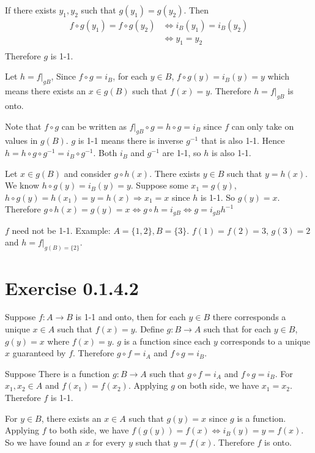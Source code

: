\documentclass[12pt]{article}
\begin{document}
 If there exists $y_1, y_2$ such that $g(y_1) = g(y_2)$. Then 
$$ \begin{aligned}
	f\circ g(y_1) = f \circ g(y_2) & \Leftrightarrow i_B(y_1) = i_B(y_2)  \\
	 &\Leftrightarrow	y_1 = y_2  \\
\end{aligned}
$$
Therefore $g$ is 1-1.  \QED

Let $h = f|_{gB}$, Since $f \circ g = i_B$, for each $y \in B$, $f \circ g (y) = i_B(y) = y$ which means there exists an $x \in g(B)$ such that $f(x) = y$. Therefore $h = f|_{gB}$ is onto. 

Note that $f \circ g$ can be written as $f|_{gB} \circ g = h \circ g = i_B$ since $f$ can only take on values in $g(B)$. $g$ is 1-1 means there is inverse $g^{-1}$ that is also 1-1. Hence $h = h \circ g \circ g^{-1} = i_B \circ g^{-1}$. Both $i_B$ and  $g^{-1}$ are 1-1, so $h$ is also 1-1.  \QED

Let $x \in g(B)$ and consider $g \circ h (x)$. There exists $y \in B$ such that $y = h(x)$. We know $h \circ g (y) = i_B(y) = y$. Suppose some $x_1 = g(y)$,  $h \circ g(y) = h(x_1) = y = h(x) \Rightarrow x_1 = x$ since $h$ is 1-1. So $g(y) = x$.  Therefore $g \circ h (x) = g (y) = x \Leftrightarrow g \circ h = i_{gB} \Leftrightarrow g = i_{gB} h^{-1}$  \QED

$f$ need not be 1-1. Example: $A = \{1, 2\}, B=\{3\}$. $f(1) = f(2) = 3$, $g(3) = 2$ and $h = f|_{g(B) =\{2\}}$.\QED

\section*{Exercise 0.1.4.2}
Suppose $f: A \rightarrow B$ is 1-1 and onto, then for each $y \in B$ there corresponds a unique $x \in A$ such that $f(x) = y$.  Define $g: B \rightarrow A$ such that for each $y \in B$, $g(y) = x$ where $f(x) =y$. $g$ is a function since each $y$ corresponds to a unique $x$ guaranteed by $f$. Therefore $g\circ f = i_A$ and $f \circ g = i_B$. \QED

Suppose There is a function $g : B \rightarrow A$ such that $g \circ f = i_A$ and $f \circ g = i_B$. For $x_1, x_2 \in A$ and $f(x_1) = f(x_2)$. Applying $g$ on both side, we have $x_1 = x_2$. Therefore $f$ is 1-1. 

For $y \in B$, there exists an $x \in A$ such that $g(y) = x$ since $g$ is a function. Applying $f$ to both side, we have $f(g(y)) = f(x) \Leftrightarrow i_B(y) = y = f(x)$. So we have found an $x$ for every $y$ such that $y = f(x)$.  Therefore $f$ is onto.  \QED
\end{document}
